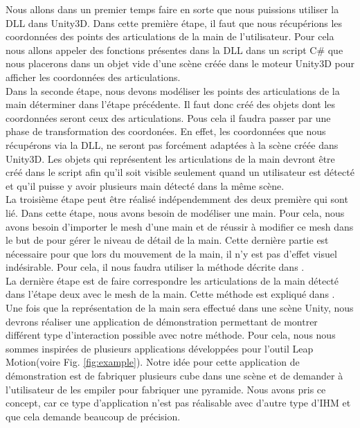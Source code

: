 Nous allons dans un premier temps faire en sorte que nous puissions utiliser la DLL dans Unity3D.
Dans cette première étape, il faut que nous récupérions les coordonnées des points des articulations
de la main de l'utilisateur. Pour cela nous allons appeler des fonctions présentes dans la DLL dans un 
script C\# que nous placerons dans un objet vide d'une scène créée dans le moteur Unity3D pour
afficher les coordonnées des articulations.\\

Dans la seconde étape, nous devons modéliser les points des articulations de la main déterminer 
dans l'étape précédente. Il faut donc créé des objets dont les coordonnées seront ceux des articulations.
Pous cela il faudra passer par une phase de transformation des coordonées. En effet, les coordonnées
que nous récupérons via la DLL, ne seront pas forcément adaptées à la scène créée dans Unity3D. Les 
objets qui représentent les articulations de la main devront être créé dans le script afin qu'il 
soit visible seulement quand un utilisateur est détecté et qu'il puisse y avoir plusieurs main
détecté dans la même scène.\\

La troisième étape peut être réalisé indépendemment des deux première qui sont lié. Dans cette étape,
nous avons besoin de modéliser une main. Pour cela, nous avons besoin d'importer le mesh d'une main et
de réussir à modifier ce mesh dans le but de pour gérer le niveau de détail de la main. Cette dernière
partie est nécessaire pour que lors du mouvement de la main, il n'y est pas d'effet visuel indésirable.
Pour cela, il nous faudra utiliser la méthode décrite dans \cite{export:217428}.\\

La dernière étape est de faire correspondre les articulations de la main détecté dans l'étape deux avec
le mesh de la main. Cette méthode est expliqué dans \cite{export:217428}.\\

Une fois que la représentation de la main sera effectué dans une scène Unity, nous devrons réaliser une 
application de démonstration permettant de montrer différent type d'interaction possible avec notre 
méthode. Pour cela, nous nous sommes inspirées de plusieurs applications développées pour l'outil
Leap Motion(voire Fig. \ref{fig:example}). Notre idée pour cette application de démonstration est de fabriquer plusieurs cube dans 
une scène et de demander à l'utilisateur de les empiler pour fabriquer une pyramide. Nous avons pris
ce concept, car ce type d'application n'est pas réalisable avec d'autre type d'IHM et que cela demande
beaucoup de précision.

